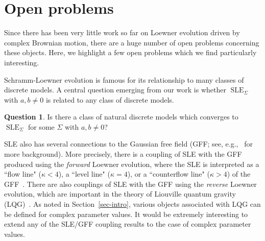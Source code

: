 \documentclass[11pt]{article}
\theoremstyle{plain}
\theoremstyle{definition}
\newtheorem{ques}[thm]{Question}
\numberwithin{equation}{section}
\newcommand{\SLE}{{\operatorname{SLE}}_\kappa}
\newcommand{\SLEG}{{\operatorname{SLE}}_\Sigma}
\newcommand{\ccM}{{\mathbf{c}_{\mathrm M}}}
\begin{document}
\section{Open problems}
\label{sec-problems}

Since there has been very little work so far on Loewner evolution driven by complex Brownian motion, there are a huge number of open problems concerning these objects. Here, we highlight a few open problems which we find particularly interesting. 

Schramm-Loewner evolution is famous for its relationship to many classes of discrete models.  A central question emerging from our work is whether $\SLEG$ with $a,b \neq 0$ is related to any class of discrete models.

\begin{ques}
Is there a class of natural discrete models which converges to $\SLEG$ for some $\Sigma$ with $a,b \neq 0$?
\end{ques}
 

SLE also has several connections to the Gaussian free field (GFF; see, e.g.,~\cite{bp-lqg-notes,shef-gff} for more background). More precisely, there is a coupling of SLE with the GFF produced using the \emph{forward} Loewner evolution, where the SLE is interpreted as a ``flow line" ($\kappa < 4$), a ``level line" ($\kappa=4$), or a ``counterflow line" ($\kappa > 4$) of the GFF~\cite{ss-contour,dubedat-coupling,ig1,ig4}. There are also couplings of SLE with the GFF using the \emph{reverse} Loewner evolution, which are important in the theory of Liouville quantum gravity (LQG)~\cite{shef-zipper,wedges}. As noted in Section~\ref{sec-intro}, various objects associated with LQG can be defined for complex parameter values. It would be extremely interesting to extend any of the SLE/GFF coupling results to the case of complex parameter values. 
 
\end{document}
